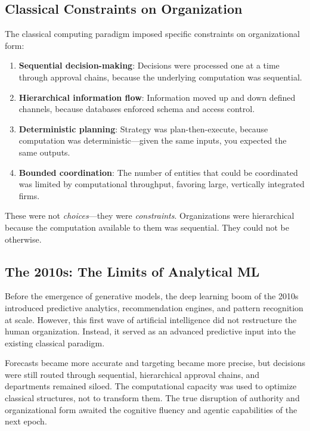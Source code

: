\documentclass[11pt,a4paper,twocolumn]{article}
\begin{document}
\subsection{Classical Constraints on Organization}

The classical computing paradigm imposed specific constraints on organizational form:

\begin{enumerate}[leftmargin=1.5em]
  \item \textbf{Sequential decision-making}: Decisions were processed one at a time through approval chains, because the underlying computation was sequential.
  \item \textbf{Hierarchical information flow}: Information moved up and down defined channels, because databases enforced schema and access control.
  \item \textbf{Deterministic planning}: Strategy was plan-then-execute, because computation was deterministic---given the same inputs, you expected the same outputs.
  \item \textbf{Bounded coordination}: The number of entities that could be coordinated was limited by computational throughput, favoring large, vertically integrated firms.
\end{enumerate}

These were not \textit{choices}---they were \textit{constraints}. Organizations were hierarchical because the computation available to them was sequential. They could not be otherwise.

\subsection{The 2010s: The Limits of Analytical ML}

Before the emergence of generative models, the deep learning boom of the 2010s introduced predictive analytics, recommendation engines, and pattern recognition at scale. However, this first wave of artificial intelligence did not restructure the human organization. Instead, it served as an advanced predictive input into the existing classical paradigm. 

Forecasts became more accurate and targeting became more precise, but decisions were still routed through sequential, hierarchical approval chains, and departments remained siloed. The computational capacity was used to optimize classical structures, not to transform them. The true disruption of authority and organizational form awaited the cognitive fluency and agentic capabilities of the next epoch.
\end{document}
